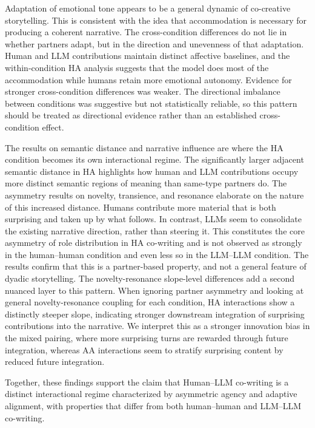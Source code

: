 \documentclass[11pt]{article}
\begin{document}
Adaptation of emotional tone appears to be a general dynamic of co-creative storytelling. This is consistent with the idea that accommodation is necessary for producing a coherent narrative. The cross-condition differences do not lie in whether partners adapt, but in the direction and unevenness of that adaptation. Human and LLM contributions maintain distinct affective baselines, and the within-condition HA analysis suggests that the model does most of the accommodation while humans retain more emotional autonomy. Evidence for stronger cross-condition differences was weaker. The directional imbalance between conditions was suggestive but not statistically reliable, so this pattern should be treated as directional evidence rather than an established cross-condition effect.

The results on semantic distance and narrative influence are where the HA condition becomes its own interactional regime. The significantly larger adjacent semantic distance in HA highlights how human and LLM contributions occupy more distinct semantic regions of meaning than same-type partners do. The asymmetry results on novelty, transience, and resonance elaborate on the nature of this increased distance. Humans contribute more material that is both surprising and taken up by what follows. In contrast, LLMs seem to consolidate the existing narrative direction, rather than steering it. This constitutes the core asymmetry of role distribution in HA co-writing and is not observed as strongly in the human--human condition and even less so in the LLM--LLM condition. The results confirm that this is a partner-based property, and not a general feature of dyadic storytelling.
The novelty-resonance slope-level differences add a second nuanced layer to this pattern. When ignoring partner asymmetry and looking at general novelty-resonance coupling for each condition, HA interactions show a distinctly steeper slope, indicating stronger downstream integration of surprising contributions into the narrative. We interpret this as a stronger innovation bias in the mixed pairing, where more surprising turns are rewarded through future integration, whereas AA interactions seem to stratify surprising content by reduced future integration.

Together, these findings support the claim that Human--LLM co-writing is a distinct interactional regime characterized by asymmetric agency and adaptive alignment, with properties that differ from both human--human and LLM--LLM co-writing. %
\end{document}
